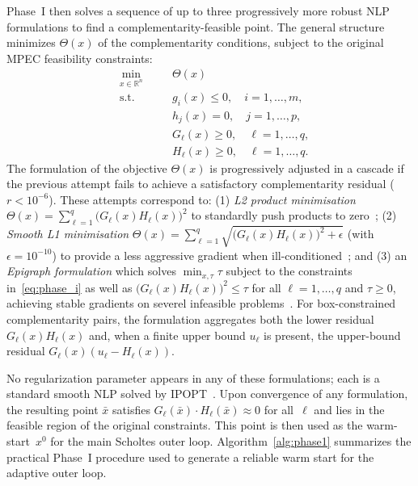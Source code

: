 Phase~I then solves a sequence of up to three progressively more robust NLP formulations to find a complementarity-feasible point. The general structure minimizes $\Theta(x)$ of the complementarity conditions, subject to the original MPEC feasibility constraints:
\begin{equation}
\begin{aligned}
  & \min_{x \in \mathbb{R}^n} \quad && \Theta(x) \\
  & \text{s.t.} \quad && g_i(x) \leq 0, \quad i = 1, \ldots, m, \\
  & && h_j(x) = 0, \quad j = 1, \ldots, p, \\
  & && G_\ell(x) \geq 0, \quad \ell = 1, \ldots, q, \\
  & && H_\ell(x) \geq 0, \quad \ell = 1, \ldots, q.
\end{aligned}
\label{eq:phase_i}
\end{equation}
The formulation of the objective $\Theta(x)$ is progressively adjusted in a cascade if the previous attempt fails to achieve a satisfactory complementarity residual ($r < 10^{-6}$). These attempts correspond to: (1) \emph{L2 product minimisation} $\Theta(x) = \sum_{\ell=1}^q \big(G_\ell(x) H_\ell(x)\big)^2$ to standardly push products to zero~\cite{NocedalWright2006}; (2) \emph{Smooth L1 minimisation} $\Theta(x) = \sum_{\ell=1}^q \sqrt{\big(G_\ell(x) H_\ell(x)\big)^2 + \epsilon}$ (with $\epsilon = 10^{-10}$) to provide a less aggressive gradient when ill-conditioned~\cite{Fischer1992,FacchineiPang2003}; and (3) an \emph{Epigraph formulation} which solves $\min_{x, \tau} \tau$ subject to the constraints in~\eqref{eq:phase_i} as well as $\big(G_\ell(x) H_\ell(x)\big)^2 \leq \tau$ for all $\ell = 1, \ldots, q$ and $\tau \geq 0$, achieving stable gradients on severel infeasible problems~\cite{RockafellarWets1998}. For box-constrained complementarity pairs, the formulation aggregates both the lower residual $G_\ell(x) H_\ell(x)$ and, when a finite upper bound $u_\ell$ is present, the upper-bound residual $G_\ell(x)(u_\ell - H_\ell(x))$.

No regularization parameter appears in any of these formulations; each is a standard smooth NLP solved by IPOPT~\cite{WachterBiegler2006}. Upon convergence of any formulation, the resulting point $\bar{x}$ satisfies $G_\ell(\bar{x}) \cdot H_\ell(\bar{x}) \approx 0$ for all~$\ell$ and lies in the feasible region of the original constraints. This point is then used as the warm-start~$x^0$ for the main Scholtes outer loop. Algorithm~\ref{alg:phase1} summarizes the practical Phase~I procedure used to generate a reliable warm start for the adaptive outer loop.

